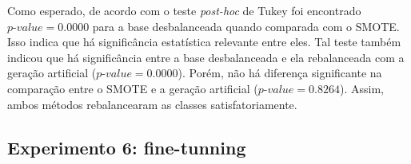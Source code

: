 

Como esperado, de acordo com o teste \textit{post-hoc} de Tukey foi encontrado $\textit{p-value} = 0.0000$ para a base desbalanceada quando comparada com o SMOTE. Isso indica que há significância estatística relevante entre eles. Tal teste também indicou que há significância entre a base desbalanceada e ela rebalanceada com a geração artificial ($\textit{p-value} = 0.0000$). Porém, não há diferença significante na comparação entre o SMOTE e a geração artificial ($\textit{p-value} = 0.8264$). Assim, ambos métodos rebalancearam as classes satisfatoriamente.

\FloatBarrier
\subsection{Experimento 6: fine-tunning}




